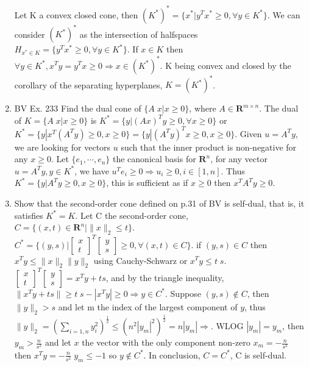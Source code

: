 \documentclass[10pt]{article}
\newcommand{\0}{\mat{0}}
\begin{document}
\begin{enumerate}
Let K a convex closed cone, then $(K^*)^* = \{x^* | y^T x^* \ge 0, \forall y \in K^* \}$.  We can consider $(K^*)^*$ as the intersection of halfspaces $H_{x^* \in K} = \{y^T x^* \ge 0, \forall y \in K^* \}$. If $x \in K$ then $\forall y \in K^*, x^T y = y^T x \ge 0 \Rightarrow x \in (K^*)^*$. K being convex and closed by the corollary of the separating hyperplanes, $K = (K^*)^*$.

\item BV Ex. 233 Find the dual cone of $\{ A \; x | x \ge 0 \}$, where $A \in \mathbf{R}^{m \times n}$. 
The dual of $K = \{ A \; x | x \ge 0 \}$ is $K^* = \{ y | (A x)^T y \ge 0, \forall x \ge 0 \}$ or $K^* = \{ y | x^T (A^T y) \ge 0,  x \ge 0 \} = \{ y | (A^T y)^T x \ge 0, x \ge 0 \}$. 
Given $u = A^T y$, we are looking for vectors $u$ such that the inner product is non-negative for any $x \ge 0$.
Let $\{e_1, \cdots  ,e_n\}$ the canonical basis for $\mathbf{R}^n$, for any vector $u = A^T y, y \in K^*$, we have $u^T e_i \ge 0 \Rightarrow u_i \ge 0, i \in [1,n]$.
Thus $K^* = \{ y | A^T y \ge 0, x \ge 0\}$, this is sufficient as if $ x\ge 0$ then $x^T  A^T y \ge 0$.
	
\item Show that the second-order cone defined on p.31 of BV is self-dual, that is, it satisfies $K^* = K$.
Let C the second-order cone, $C=\{(x, t) \in  \mathbf{R}^n | \| x \|_2 \le t \}$. $C^* = \{(y,s) | \begin{bmatrix} x \\ t  \end{bmatrix}^T \begin{bmatrix} y \\ s  \end{bmatrix} \ge 0, \forall (x,t) \in C\}$.
if $(y, s) \in C$ then $x^T y \le \| x \|_2 \| y \|_2$ using Cauchy-Schwarz or  $x^T y \le t \; s$. 
$\begin{bmatrix} x \\ t  \end{bmatrix}^T \begin{bmatrix} y \\ s  \end{bmatrix}  = x^T y + ts$, and by the triangle inequality, $\|x^T y + ts\|  \ge t \; s - | x^T y | \ge 0 \Rightarrow y \in C^*$.
Suppose $(y, s) \notin C$, then $\| y \|_2 > s$ and let m the index of the largest component of $y$, 
thus $\| y \|_2 = (\sum_{i=1,n} y_i^2)^{\frac{1}{2}} \le (n^2 |y_m|^2)^{\frac{1}{2}} = n |y_m| \Rightarrow $. WLOG $| y_m | = y_m$, then $y_m > \frac{n} {s^2}$
and let $x$ the vector with the only component non-zero $x_m = - \frac{n} {s^2}$ then $x^T y = - \frac{n} {s^2} \; y_m \le - 1$ so $y \notin C^*$.
In conclusion, $C = C^*$, C is self-dual.
 

\end{enumerate}
\end{document}
